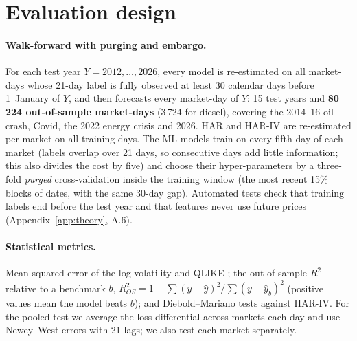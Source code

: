 \section{Evaluation design}\label{sec:evaluation}

\paragraph{Walk-forward with purging and embargo.} For each test year $Y=2012,\dots,2026$, every model is
re-estimated on all market-days whose 21-day label is fully observed at least 30 calendar days before
1~January of $Y$, and then forecasts every market-day of $Y$: 15 test years and \textbf{80\,224
out-of-sample market-days} (3\,724 for diesel), covering the 2014--16 oil crash, Covid, the 2022 energy crisis
and 2026. HAR and HAR-IV are re-estimated per market on all training days. The ML models train on every fifth
day of each market (labels overlap over 21 days, so consecutive days add little information; this also
divides the cost by five) and choose their hyper-parameters by a three-fold \emph{purged} cross-validation
inside the training window (the most recent 15\% blocks of dates, with the same 30-day gap). Automated tests
check that training labels end before the test year and that features never use future prices
(Appendix~\ref{app:theory}, A.6).

\paragraph{Statistical metrics.} Mean squared error of the log volatility and QLIKE \citep{patton2011};
the out-of-sample $R^2$ relative to a benchmark $b$, $R^2_{OS}=1-\sum(y-\hat y)^2/\sum(y-\hat y_b)^2$
(positive values mean the model beats $b$); and Diebold--Mariano tests against HAR-IV. For the pooled test we
average the loss differential across markets each day and use Newey--West errors with 21 lags; we also test
each market separately.

